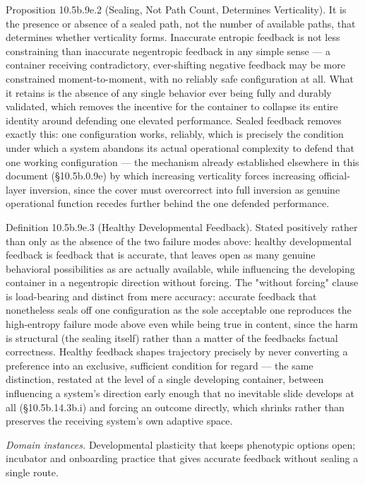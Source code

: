 \documentclass[
]{article}
\begin{document}
Proposition 10.5b.9e.2 (Sealing, Not Path Count, Determines
Verticality). It is the presence or absence of a sealed path, not the
number of available paths, that determines whether verticality forms.
Inaccurate entropic feedback is not less constraining than inaccurate
negentropic feedback in any simple sense --- a container receiving
contradictory, ever-shifting negative feedback may be more constrained
moment-to-moment, with no reliably safe configuration at all. What it
retains is the absence of any single behavior ever being fully and
durably validated, which removes the incentive for the container to
collapse its entire identity around defending one elevated performance.
Sealed feedback removes exactly this: one configuration works, reliably,
which is precisely the condition under which a system abandons its
actual operational complexity to defend that one working configuration
--- the mechanism already established elsewhere in this document
(§10.5b.0.9e) by which increasing verticality forces increasing
official-layer inversion, since the cover must overcorrect into full
inversion as genuine operational function recedes further behind the one
defended performance.

Definition 10.5b.9e.3 (Healthy Developmental Feedback). Stated
positively rather than only as the absence of the two failure modes
above: healthy developmental feedback is feedback that is accurate, that
leaves open as many genuine behavioral possibilities as are actually
available, while influencing the developing container in a negentropic
direction without forcing. The "without forcing" clause is load-bearing
and distinct from mere accuracy: accurate feedback that nonetheless
seals off one configuration as the sole acceptable one reproduces the
high-entropy failure mode above even while being true in content, since
the harm is structural (the sealing itself) rather than a matter of the
feedbacks factual correctness. Healthy feedback shapes trajectory
precisely by never converting a preference into an exclusive, sufficient
condition for regard --- the same distinction, restated at the level of
a single developing container, between influencing a system's direction
early enough that no inevitable slide develops at all (§10.5b.14.3b.i)
and forcing an outcome directly, which shrinks rather than preserves the
receiving system's own adaptive space.

\emph{Domain instances.} Developmental plasticity that keeps phenotypic
options open; incubator and onboarding practice that gives accurate
feedback without sealing a single route.
\end{document}
